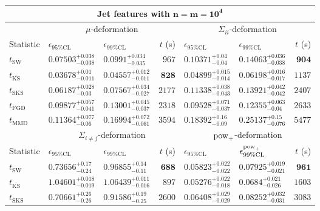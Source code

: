 \begin{tabular}{l|llr|llr}
	\toprule
	\multicolumn{7}{c}{{\bf Jet features with $\mathbf{n=m=10^{4}}$}} \\
	\toprule
	\multicolumn{1}{c}{} & \multicolumn{3}{c}{$\mu$-deformation} & \multicolumn{3}{c}{$\Sigma_{ii}$-deformation} \\
	Statistic & $\epsilon_{95\%\mathrm{CL}}$ & $\epsilon_{99\%\mathrm    {CL}}$ & $t$ (s) & $\epsilon_{95\%\mathrm{CL}}$ & $\epsilon_{99\%\mathrm{CL}}$ & $t$ (s) \\
	\midrule
	$t_{\mathrm{SW}}$ & $0.07503_{-0.038}^{+0.038}$ & $0.0991_{-0.035}^{+0.034}$ & $967$ & $0.10371_{-0.04}^{+0.04}$ & $0.14063_{-0.038}^{+0.036}$ & ${\mathbf{904}}$ \\
	$t_{\overline{\mathrm{KS}}}$ & ${\mathbf{0.03678_{-0.011}^{+0.01}}}$ & ${\mathbf{0.04557_{-0.011}^{+0.012}}}$ & ${\mathbf{828}}$ & ${\mathbf{0.04899_{-0.014}^{+0.015}}}$ & ${\mathbf{0.06198_{-0.017}^{+0.016}}}$ & $1137$ \\
	$t_{\mathrm{SKS}}$ & $0.06187_{-0.03}^{+0.028}$ & $0.07567_{-0.027}^{+0.034}$ & $2177$ & $0.11338_{-0.043}^{+0.038}$ & $0.13921_{-0.042}^{+0.042}$ & $2407$ \\
	$t_{\mathrm{FGD}}$ & $0.09877_{-0.041}^{+0.057}$ & $0.13001_{-0.037}^{+0.045}$ & $2318$ & $0.09528_{-0.037}^{+0.071}$ & $0.12355_{-0.04}^{+0.063}$ & $2633$ \\
	$t_{\mathrm{MMD}}$ & $0.11364_{-0.06}^{+0.077}$ & $0.16994_{-0.061}^{+0.072}$ & $3594$ & $0.18392_{-0.09}^{+0.16}$ & $0.25137_{-0.076}^{+0.15}$ & $5477$ \\
	\toprule
	\multicolumn{1}{c}{} & \multicolumn{3}{c}{$\Sigma_{i\neq j}$-deformation} & \multicolumn{3}{c}{$\rm{pow}_{+}$-deformation} \\
	Statistic & $\epsilon_{95\%\mathrm{CL}}$ & $\epsilon_{99\%\mathrm{CL}}$ & $t$ (s) & $\epsilon_{95\%\mathrm{CL}}$ & $\epsilon^{\rm   {pow}_{+}}_{99\%\mathrm{CL}}$ & $t$ (s) \\
	\midrule
	$t_{\mathrm{SW}}$ & $0.73656_{-0.24}^{+0.17}$ & $0.96855_{-0.11}^{+0.14}$ & ${\mathbf{688}}$ & $0.05823_{-0.022}^{+0.022}$ & $0.07925_{-0.021}^{+0.019}$ & ${\mathbf{961}}$ \\
	$t_{\overline{\mathrm{KS}}}$ & $1.04601_{-0.019}^{+0.018}$ & $1.06439_{-0.016}^{+0.011}$ & $897$ & ${\mathbf{0.05276_{-0.018}^{+0.022}}}$ & $0.0684_{-0.026}^{+0.021}$ & $1603$ \\
	$t_{\mathrm{SKS}}$ & $0.70661_{-0.26}^{+0.26}$ & $0.91586_{-0.25}^{+0.19}$ & $2600$ & $0.06408_{-0.029}^{+0.029}$ & $0.08252_{-0.031}^{+0.032}$ & $3083$ \\

\end{tabular}
